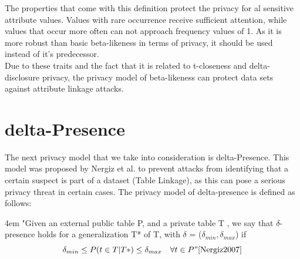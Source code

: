 \documentclass[12pt, a4paper,oneside]{report}
\begin{document}
The properties that come with this definition protect the privacy for al sensitive attribute values. Values with rare occurrence receive sufficient attention, while values that occur more often can not approach frequency values of 1. As it is more robust than basic beta-likeness in terms of privacy, it should be used instead of it's predecessor\cite{Cao2012}.\\
Due to these traits and the fact that it is related to t-closeness and delta-disclosure privacy, the privacy model of beta-likeness can protect data sets against attribute linkage attacks.

\section{delta-Presence}

The next privacy model that we take into consideration is delta-Presence. This model was proposed by Nergiz et al. to prevent attacks from identifying that a certain suspect is part of a dataset (Table Linkage), as this can pose a serious privacy threat in certain cases\cite{Nergiz2007}.\newpage
The privacy model of delta-presence is defined as follows:\\
\par
\begingroup
\leftskip4em
\rightskip\leftskip
"Given an external public table P, and a private table T , we say that $\delta$-presence holds for a generalization T* of T, with $\delta$ = ($\delta_{min},\delta_{max}$) if
\[ \delta_{min} \le P(t \in T|T*) \le \delta_{max} \quad \forall t \in P"\cite{Nergiz2007}\]
\par
\endgroup
\end{document}
